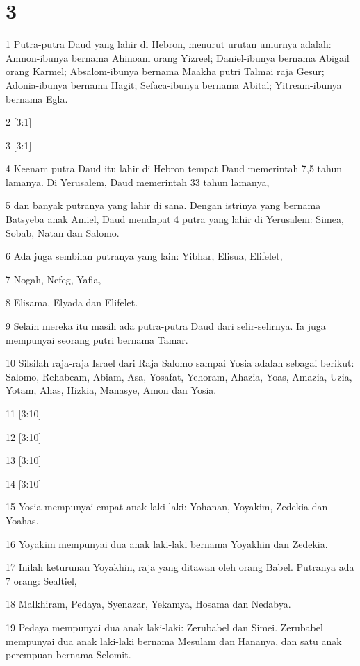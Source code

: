 \chapter{3}

\par 1 Putra-putra Daud yang lahir di Hebron, menurut urutan umurnya adalah: Amnon-ibunya bernama Ahinoam orang Yizreel; Daniel-ibunya bernama Abigail orang Karmel; Absalom-ibunya bernama Maakha putri Talmai raja Gesur; Adonia-ibunya bernama Hagit; Sefaca-ibunya bernama Abital; Yitream-ibunya bernama Egla.
\par 2 [3:1]
\par 3 [3:1]
\par 4 Keenam putra Daud itu lahir di Hebron tempat Daud memerintah 7,5 tahun lamanya. Di Yerusalem, Daud memerintah 33 tahun lamanya,
\par 5 dan banyak putranya yang lahir di sana. Dengan istrinya yang bernama Batsyeba anak Amiel, Daud mendapat 4 putra yang lahir di Yerusalem: Simea, Sobab, Natan dan Salomo.
\par 6 Ada juga sembilan putranya yang lain: Yibhar, Elisua, Elifelet,
\par 7 Nogah, Nefeg, Yafia,
\par 8 Elisama, Elyada dan Elifelet.
\par 9 Selain mereka itu masih ada putra-putra Daud dari selir-selirnya. Ia juga mempunyai seorang putri bernama Tamar.
\par 10 Silsilah raja-raja Israel dari Raja Salomo sampai Yosia adalah sebagai berikut: Salomo, Rehabeam, Abiam, Asa, Yosafat, Yehoram, Ahazia, Yoas, Amazia, Uzia, Yotam, Ahas, Hizkia, Manasye, Amon dan Yosia.
\par 11 [3:10]
\par 12 [3:10]
\par 13 [3:10]
\par 14 [3:10]
\par 15 Yosia mempunyai empat anak laki-laki: Yohanan, Yoyakim, Zedekia dan Yoahas.
\par 16 Yoyakim mempunyai dua anak laki-laki bernama Yoyakhin dan Zedekia.
\par 17 Inilah keturunan Yoyakhin, raja yang ditawan oleh orang Babel. Putranya ada 7 orang: Sealtiel,
\par 18 Malkhiram, Pedaya, Syenazar, Yekamya, Hosama dan Nedabya.
\par 19 Pedaya mempunyai dua anak laki-laki: Zerubabel dan Simei. Zerubabel mempunyai dua anak laki-laki bernama Mesulam dan Hananya, dan satu anak perempuan bernama Selomit.
